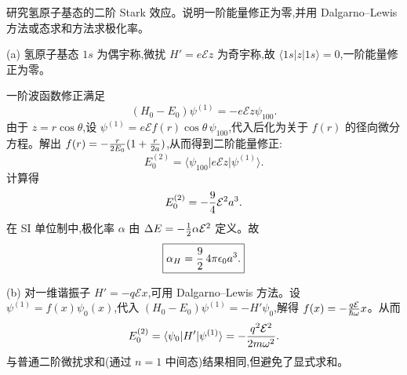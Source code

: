 \begin{question}
研究氢原子基态的二阶 Stark 效应。说明一阶能量修正为零,并用 Dalgarno--Lewis 方法或态求和方法求极化率。
\begin{solution}
(a) 氢原子基态 $1s$ 为偶宇称,微扰 $H'=e\mathcal Ez$ 为奇宇称,故 $\langle 1s|z|1s\rangle=0$,一阶能量修正为零。

一阶波函数修正满足
\[
(H_0 - E_0)\psi^{(1)} = -e\mathcal E z\psi_{100}.
\]
由于 $z = r\cos\theta$,设 $\psi^{(1)} = e\mathcal E f(r)\cos\theta\,\psi_{100}$,代入后化为关于 $f(r)$ 的径向微分方程。解出 $f(r) = -{r\over2E_0}(1+{r\over2a})$,从而得到二阶能量修正:
\[
E_0^{(2)} = \langle\psi_{100}|e\mathcal E z|\psi^{(1)}\rangle.
\]
计算得
\[
E_0^{(2)} = -{9\over4}\mathcal E^2 a^3.
\]
在 SI 单位制中,极化率 $\alpha$ 由 $\Delta E = -{1\over2}\alpha\mathcal E^2$ 定义。故
\[
\boxed{\alpha_H = {9\over2}\,4\pi\epsilon_0 a^3.}
\]

(b) 对一维谐振子 $H'=-q\mathcal Ex$,可用 Dalgarno--Lewis 方法。设 $\psi^{(1)} = f(x)\psi_0(x)$,代入 $(H_0-E_0)\psi^{(1)} = -H'\psi_0$,解得 $f(x) = -{q\mathcal E\over\hbar\omega}x$。从而
\[
E_0^{(2)} = \langle\psi_0|H'|\psi^{(1)}\rangle = -{q^2\mathcal E^2\over2m\omega^2}.
\]
与普通二阶微扰求和(通过 $n=1$ 中间态)结果相同,但避免了显式求和。
\end{solution}
\end{question}

